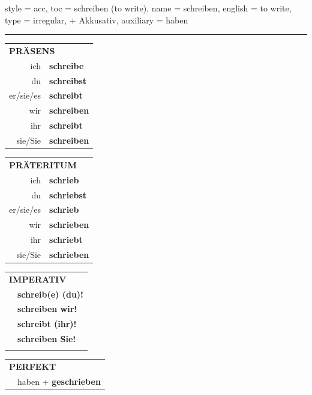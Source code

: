 \begin{verbentry}{
  style = {acc},
  toc = {schreiben (to write)},
  name = {schreiben},
  english = {to write},
  type = {irregular, + Akkusativ},
  auxiliary = {haben}
}
 
    
     \vspace{5pt}

    \hrule
    
    \vspace{5pt}

  \begin{tabular}{rl}
     \multicolumn{2}{l}{\textbf{PRÄSENS} }\\
    ich & \textbf{schreibe}\\
    du & \textbf{schreibst}\\
    er/sie/es & \textbf{schreibt}\\
    wir & \textbf{schreiben}\\
    ihr & \textbf{schreibt}\\
    sie/Sie & \textbf{schreiben}\\
  \end{tabular}
  \hfill
     \begin{tabular}{rl}
    \multicolumn{2}{l}{\textbf{PRÄTERITUM} }\\
    ich & \textbf{schrieb}\\
    du & \textbf{schriebst}\\
    er/sie/es & \textbf{schrieb}\\
    wir & \textbf{schrieben}\\
    ihr & \textbf{schriebt}\\
    sie/Sie & \textbf{schrieben}\\
  \end{tabular}
  \hfill
  \begin{tabular}{rl}
     \multicolumn{2}{l}{\textbf{IMPERATIV} }\\
   & \textbf{schreib(e) (du)!}\\
   & \textbf{schreiben wir!}\\
   & \textbf{schreibt (ihr)!}\\
   & \textbf{schreiben Sie!}\\
   & \vspace{10pt}
  \end{tabular}

    \vspace{10pt}

 \begin{tabular}{rl}
     \multicolumn{2}{l}{\textbf{PERFEKT}}\\
  &  haben + \textbf{geschrieben}\\
  \end{tabular}
\hfill
   \begin{tabular}{rl}
   

\end{tabular}
\end{verbentry}
